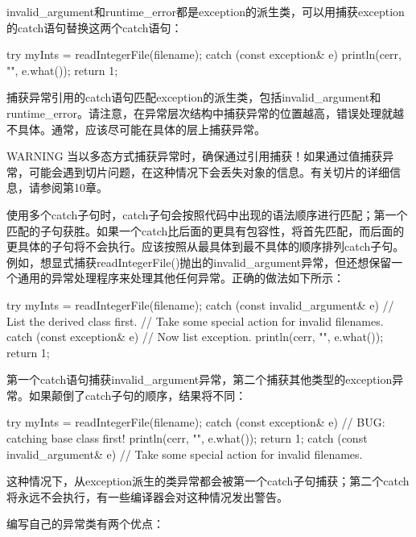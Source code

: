 invalid\_argument和runtime\_error都是exception的派生类，可以用捕获exception的catch语句替换这两个catch语句：

\begin{cpp}
try {
    myInts = readIntegerFile(filename);
} catch (const exception& e) {
    println(cerr, "{}", e.what());
    return 1;
}
\end{cpp}

捕获异常引用的catch语句匹配exception的派生类，包括invalid\_argument和runtime\_error。请注意，在异常层次结构中捕获异常的位置越高，错误处理就越不具体。通常，应该尽可能在具体的层上捕获异常。

\begin{myWarning}{WARNING}
当以多态方式捕获异常时，确保通过引用捕获！如果通过值捕获异常，可能会遇到切片问题，在这种情况下会丢失对象的信息。有关切片的详细信息，请参阅第10章。
\end{myWarning}

使用多个catch子句时，catch子句会按照代码中出现的语法顺序进行匹配；第一个匹配的子句获胜。如果一个catch比后面的更具有包容性，将首先匹配，而后面的更具体的子句将不会执行。应该按照从最具体到最不具体的顺序排列catch子句。例如，想显式捕获readIntegerFile()抛出的invalid\_argument异常，但还想保留一个通用的异常处理程序来处理其他任何异常。正确的做法如下所示：

\begin{cpp}
try {
    myInts = readIntegerFile(filename);
} catch (const invalid_argument& e) { // List the derived class first.
    // Take some special action for invalid filenames.
} catch (const exception& e) { // Now list exception.
    println(cerr, "{}", e.what());
    return 1;
}
\end{cpp}

第一个catch语句捕获invalid\_argument异常，第二个捕获其他类型的exception异常。如果颠倒了catch子句的顺序，结果将不同：

\begin{cpp}
try {
    myInts = readIntegerFile(filename);
} catch (const exception& e) { // BUG: catching base class first!
    println(cerr, "{}", e.what());
    return 1;
} catch (const invalid_argument& e) {
    // Take some special action for invalid filenames.
}
\end{cpp}

这种情况下，从exception派生的类异常都会被第一个catch子句捕获；第二个catch将永远不会执行，有一些编译器会对这种情况发出警告。


编写自己的异常类有两个优点：


